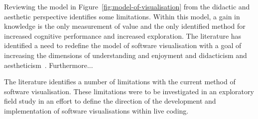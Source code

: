 

Reviewing the model in Figure~\ref{fig:model-of-visualisation} from the didactic and aesthetic perspective identifies some limitations. Within this model, a gain in knowledge is the only measurement of value and the only identified method for increased cognitive performance and increased exploration. The literature has identified a need to redefine the model of software visualisation with a goal of increasing the dimensions of understanding and enjoyment and didacticism and aestheticism~. Furthermore...

The literature identifies a number of limitations with the current method of software visualisation. These limitations were to be investigated in an exploratory field study in an effort to define the direction of the development and implementation of software visualisations within live coding. 



